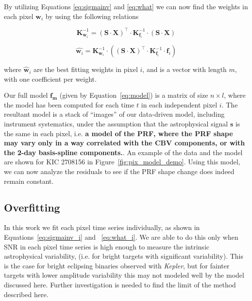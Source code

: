 \documentclass[iop]{emulateapj}
\newcommand{\kepler}{\emph{Kepler}\xspace}
\newcommand{\target}{KIC 2708156\xspace}
\newcommand{\sa}{(\mathbf{S} \cdot \mathbf{X})}
\begin{document}
By utilizing Equations \ref{eq:sigmainv} and \ref{eq:what} we can now find the weights in each pixel $\mathbf{w}_i$ by using the following relations

\begin{equation}
    \label{eq:sigmainv_i}
    \mathbf{K}_{\mathbf{w}_i}^{-1}= \sa^\intercal \cdot \mathbf{K}_{\mathbf{f}_i}^{-1} \cdot \sa
\end{equation}

\begin{equation}
    \label{eq:what_i}
    \hat{\mathbf{w}_i} = \mathbf{K}_{\mathbf{w}_i}^{-1} \cdot \left(\sa^\intercal \cdot \mathbf{K}_{\mathbf{f}_i}^{-1} \cdot \mathbf{f}_i \right)
\end{equation}

where $\hat{\mathbf{w}}_i$ are the best fitting weights in pixel $i$, and is a vector with length $m$, with one coefficient per weight.

Our full model $\mathbf{f_m}$ (given by Equation~\ref{eq:model}) is a matrix of size $n \times l$, where the model has been computed for each time $t$ in each independent pixel $i$. The resultant model is a stack of ``images'' of our data-driven model, including instrument systematics, under the assumption that the astrophysical signal $\mathbf{s}$ is the same in each pixel, i.e. \textbf{a model of the PRF, where the PRF shape may vary only in a way correlated with the CBV components, or with the 2-day basis-spline components.}. An example of the data and the model are shown for \target in Figure~\ref{fig:pix_model_demo}. Using this model, we can now analyze the residuals to see if the PRF shape change does indeed remain constant.

\subsection{Overfitting}

In this work we fit each pixel time series individually, as shown in Equations~\ref{eq:sigmainv_i} and ~\ref{eq:what_i}. We are able to do this only when SNR in each pixel time series is high enough to measure the intrinsic astrophysical variability, (i.e. for bright targets with significant variability). This is the case for bright eclipsing binaries observed with \kepler, but for fainter targets with lower amplitude variability this may not modeled well by the model discussed here. Further investigation is needed to find the limit of the method described here.
\end{document}
